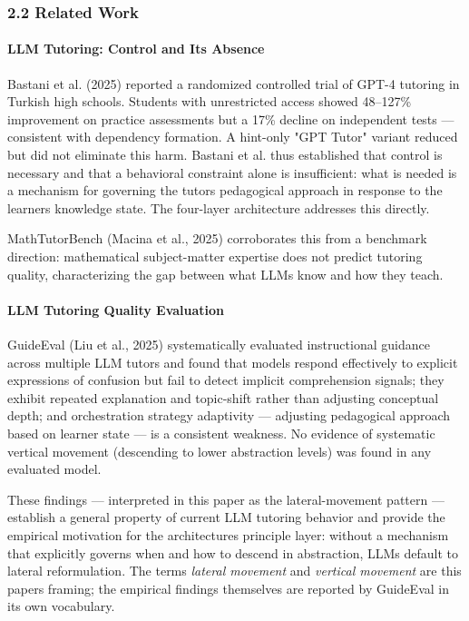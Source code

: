 \documentclass[
]{article}
\begin{document}
\subsubsection{2.2 Related Work}\label{22-related-work}

\paragraph{LLM Tutoring: Control and Its Absence}\label{llm-tutoring-control-and-its-absence}

Bastani et al. (2025) reported a randomized controlled trial of GPT-4 tutoring in Turkish high schools. Students with unrestricted access showed 48--127\% improvement on practice assessments but a 17\% decline on independent tests --- consistent with dependency formation. A hint-only "GPT Tutor" variant reduced but did not eliminate this harm. Bastani et al. thus established that control is necessary and that a behavioral constraint alone is insufficient: what is needed is a mechanism for governing the tutor\textquotesingle s pedagogical approach in response to the learner\textquotesingle s knowledge state. The four-layer architecture addresses this directly.

MathTutorBench (Macina et al., 2025) corroborates this from a benchmark direction: mathematical subject-matter expertise does not predict tutoring quality, characterizing the gap between what LLMs know and how they teach.

\paragraph{LLM Tutoring Quality Evaluation}\label{llm-tutoring-quality-evaluation}

GuideEval (Liu et al., 2025) systematically evaluated instructional guidance across multiple LLM tutors and found that models respond effectively to explicit expressions of confusion but fail to detect implicit comprehension signals; they exhibit repeated explanation and topic-shift rather than adjusting conceptual depth; and orchestration strategy adaptivity --- adjusting pedagogical approach based on learner state --- is a consistent weakness. No evidence of systematic vertical movement (descending to lower abstraction levels) was found in any evaluated model.

These findings --- interpreted in this paper as the lateral-movement pattern --- establish a general property of current LLM tutoring behavior and provide the empirical motivation for the architecture\textquotesingle s principle layer: without a mechanism that explicitly governs when and how to descend in abstraction, LLMs default to lateral reformulation. The terms \emph{lateral movement} and \emph{vertical movement} are this paper\textquotesingle s framing; the empirical findings themselves are reported by GuideEval in its own vocabulary.
\end{document}
